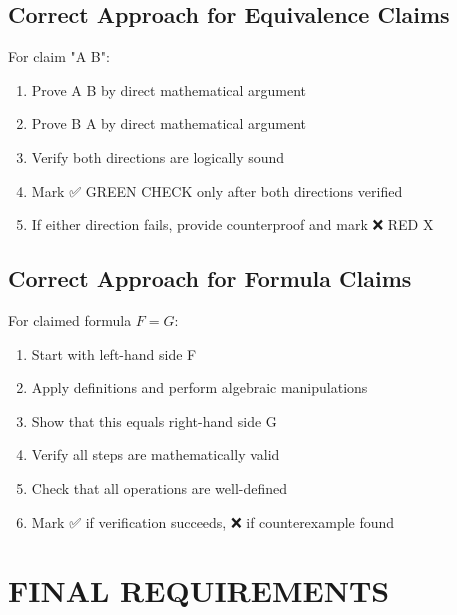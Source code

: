 \documentclass{article}
\begin{document}
\subsection{Correct Approach for Equivalence Claims}

For claim "A {\Longleftrightarrow} B":
\begin{enumerate}
  \item Prove A {\Longrightarrow} B by direct mathematical argument
  
  \item Prove B {\Longrightarrow} A by direct mathematical argument
  
  \item Verify both directions are logically sound
  
  \item Mark ✅ GREEN CHECK only after both directions verified
  
  \item If either direction fails, provide counterproof and mark ❌ RED X
\end{enumerate}

\subsection{Correct Approach for Formula Claims}

For claimed formula $F = G$:
\begin{enumerate}
  \item Start with left-hand side F
  
  \item Apply definitions and perform algebraic manipulations
  
  \item Show that this equals right-hand side G
  
  \item Verify all steps are mathematically valid
  
  \item Check that all operations are well-defined
  
  \item Mark ✅ if verification succeeds, ❌ if counterexample found
\end{enumerate}

\section{FINAL REQUIREMENTS}
\end{document}
